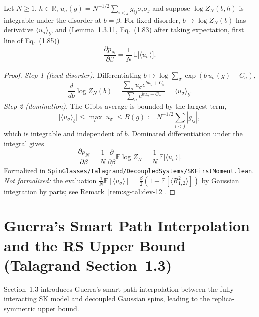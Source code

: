 \begin{theorem}\label{thm:sg-tal:beta-derivative}
  \leanok
{}
Let $N\ge1$, $h\in\mathbb R$, $u_\sigma(g)=N^{-1/2}\sum_{i<j}g_{ij}\sigma_i\sigma_j$ and suppose $\log Z_N(b,h)$ is integrable under the disorder at $b=\beta$. For fixed disorder, $b \mapsto \log Z_N(b)$ has derivative $\langle u_\sigma \rangle_b$, and (Lemma~1.3.11, Eq.~(1.83) after taking expectation, first line of Eq.~(1.85))
\[
\frac{\partial p_N}{\partial \beta} = \frac{1}{N}\, \mathbb{E}\big[\langle u_\sigma \rangle\big].
\]
\end{theorem}
\begin{proof}
  \leanok
\emph{Step 1 (fixed disorder).} Differentiating $b\mapsto\log\sum_\sigma\exp(b\,u_\sigma(g)+C_\sigma)$,
\[
\frac d{db}\log Z_N(b)=\frac{\sum_\sigma u_\sigma e^{bu_\sigma+C_\sigma}}{\sum_\sigma e^{bu_\sigma+C_\sigma}}=\langle u_\sigma\rangle_b .
\]
\emph{Step 2 (domination).} The Gibbs average is bounded by the largest term,
\[
\big|\langle u_\sigma\rangle_b\big|\le\max_\sigma|u_\sigma|\le B(g):=N^{-1/2}\sum_{i<j}|g_{ij}|,
\]
which is integrable and independent of $b$. Dominated differentiation under the integral gives
\[
\frac{\partial p_N}{\partial\beta}=\frac1N\,\frac{\partial}{\partial\beta}\mathbb E\log Z_N=\frac1N\,\mathbb E\big[\langle u_\sigma\rangle\big].
\]
Formalized in \texttt{SpinGlasses/Talagrand/DecoupledSystems/SKFirstMoment.lean}.
\emph{Not formalized:} the evaluation $\frac1N\mathbb{E}[\langle u_\sigma\rangle]=\frac{\beta}{2}(1-\mathbb{E}[\langle R_{1,2}^2\rangle])$ by Gaussian integration by parts; see Remark~\ref{rem:sg-tal:dev-12}.
\end{proof}

\section{Guerra's Smart Path Interpolation and the RS Upper Bound (Talagrand Section~1.3)}\label{sec:sg-tal:guerra-rs}

Section~1.3 introduces Guerra's smart path interpolation between the fully interacting SK model and decoupled Gaussian spins, leading to the replica-symmetric upper bound.

